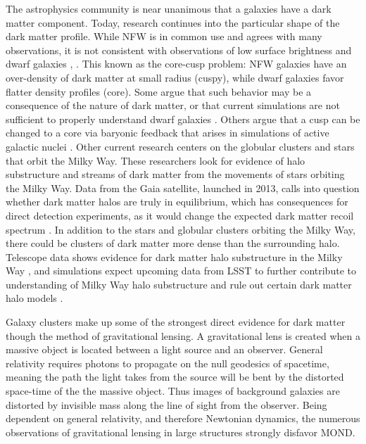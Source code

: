 The astrophysics community is near unanimous that a galaxies have a dark matter component. Today, research continues into the particular shape of the dark matter profile. While \ac{NFW} is in common use and agrees with many observations, it is not consistent with observations of low surface brightness and dwarf galaxies \cite{DeBlok2001}, \cite{DeBlok2001a}. This known as the core-cusp problem: \ac{NFW} galaxies have an over-density of dark matter at small radius (cuspy), while dwarf galaxies favor flatter density profiles (core). Some argue that such behavior may be a consequence of the nature of dark matter, or that current simulations are not sufficient to properly understand dwarf galaxies \cite{Oman2015}. Others argue that a cusp can be changed to a core via baryonic feedback that arises in simulations of active galactic nuclei \cite{Martizzi2013}. Other current research centers on the globular clusters and stars that orbit the Milky Way. These researchers look for evidence of halo substructure and streams of dark matter from the movements of stars orbiting the Milky Way. Data from the Gaia satellite, launched in 2013, calls into question whether dark matter halos are truly in equilibrium, which has consequences for direct detection experiments, as it would change the expected dark matter recoil spectrum \cite{Herzog-Arbeitman2018} \cite{Necib2018}. In addition to the stars and globular clusters orbiting the Milky Way, there could be clusters of dark matter more dense than the surrounding halo. Telescope data shows evidence for dark matter halo substructure in the Milky Way \cite{Erkal2017}, and simulations expect upcoming data from LSST to further contribute to understanding of Milky Way halo substructure and rule out certain dark matter halo models \cite{Banik2018}.

Galaxy clusters make up some of the strongest direct evidence for dark matter though the method of gravitational lensing. A gravitational lens is created when a massive object is located between a light source and an observer. General relativity requires photons to propagate on the null geodesics of spacetime, meaning the path the light takes from the source will be bent by the distorted space-time of the the massive object. Thus images of background galaxies are distorted by invisible mass along the line of sight from the observer. Being dependent on general relativity, and therefore Newtonian dynamics, the numerous observations of gravitational lensing in large structures strongly disfavor \ac{MOND}. 

